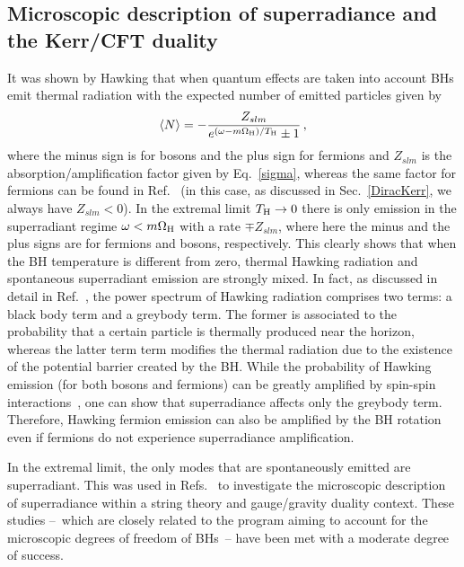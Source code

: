 \documentclass[11pt]{article}
\newcommand{\be}{\begin{equation}}
\newcommand{\ee}{\end{equation}}
\numberwithin{equation}{section} %
\begin{document}
\subsection{Microscopic description of superradiance and the Kerr/CFT duality} \label{sec:KerrCFT}


It was shown by Hawking that when quantum effects are taken into account BHs emit thermal radiation with the expected number of emitted particles given by~\cite{Hawking:1974sw}
%
\be\label{Hawking_rate}
\left\langle N\right\rangle=-\frac{Z_{slm}}{e^{(\omega-m\Omega_{\rm H})/T_{\rm H}}\pm 1}\,,
\ee
%
where the minus sign is for bosons and the plus sign for fermions and $Z_{slm}$ is the absorption/amplification factor given by Eq.~\eqref{sigma}, whereas the same factor for fermions can be found in Ref.~\cite{Page:1976df} (in this case, as discussed in Sec.~\ref{DiracKerr}, we always have $Z_{slm}<0$). In the extremal limit $T_{\rm H}\to 0$ there is only emission in the superradiant regime $\omega<m\Omega_{\rm H}$ with a rate $\mp Z_{slm}$, where here the minus and the plus signs are for fermions and bosons, respectively. This clearly shows that when the BH temperature is different from zero, thermal Hawking radiation and spontaneous superradiant emission are strongly mixed. 
In fact, as discussed in detail in Ref.~\cite{Dai:2010xp}, the power spectrum of Hawking radiation comprises two terms: a black body term and a greybody term. The former is associated to the probability that a certain particle is thermally produced near the horizon, whereas the latter term term modifies
the thermal radiation due to the existence of the potential barrier created by the BH. 
While the probability of Hawking emission (for both bosons and fermions) can be greatly amplified by spin-spin interactions~\cite{Dai:2010xp}, one can show that superradiance affects only the greybody term. Therefore, Hawking fermion emission can also be amplified
by the BH rotation even if fermions do not experience superradiance amplification.

In the extremal limit, the only modes that are spontaneously emitted are superradiant. This was used in Refs.~\cite{Dias:2007nj,Bredberg:2009pv} to investigate the microscopic description of superradiance within a string theory and gauge/gravity duality context. These studies --~which are closely related to the program aiming to account for the microscopic degrees of freedom of BHs~-- have been met with a moderate degree of success.
\end{document}
